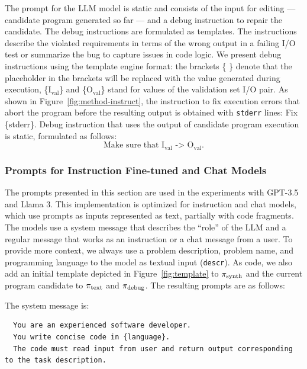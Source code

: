 The prompt for the LLM model is static and consists of the input for editing --- candidate program generated so far --- and a debug instruction to repair the candidate. 
The debug instructions are formulated as templates. The instructions describe the violated requirements in terms of the wrong output in a failing I/O test or summarize the bug to capture issues in code logic.
We present debug instructions using the template engine format: the brackets \{ \} denote that the placeholder in the brackets will be replaced with the value generated during execution, \{I$_{\text{val}}$\} and \{O$_{\text{val}}$\} stand for values of the validation set I/O pair. As shown in Figure~\ref{fig:method-instruct}, the instruction to fix execution errors that abort the program before the resulting output is obtained with \texttt{stderr} lines: Fix \{stderr\}. Debug instruction that uses the output of candidate program execution is static, formulated as follows: 
\begin{equation}\label{seidr:prompt-0} 
    \text{Make sure that I}_{\text{val}} \text{ -> O}_{\text{val}}. \tag{S0}
\end{equation}


\subsubsection{Prompts for Instruction Fine-tuned and Chat Models}
\label{sec:seidr-ollama-prompts}

The prompts presented in this section are used in the experiments with GPT-3.5 and Llama 3.
This implementation is optimized for instruction and chat models, which use prompts as inputs represented as text, partially with code fragments.
The models use a system message that describes the ``role'' of the LLM and a regular message that works as an instruction or a chat message from a user.
To provide more context, we always use a problem description, problem name, and programming language to the model as textual input (\texttt{descr}). 
As code, we also add an initial template depicted in Figure~\ref{fig:template} to $ \pi_\text{synth} $ and the current program candidate to $ \pi_\text{text} $ and $ \pi_\text{debug} $. The resulting prompts are as follows:

The system message is: 
\begin{lstlisting}
  You are an experienced software developer.
  You write concise code in {language}.
  The code must read input from user and return output corresponding to the task description.
\end{lstlisting}


